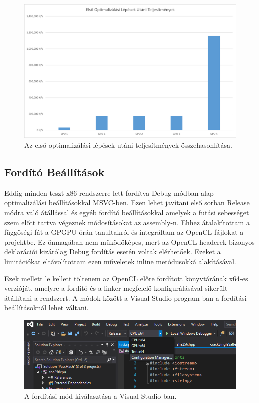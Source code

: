 \begin{figure}[H]
    \centering
    \includegraphics[width=\textwidth]{images/charts/performance-1-optimization.png}
    \caption{Az első optimalizálási lépések utáni teljesítmények összehasonlítása.}
\end{figure}





\subsection{Fordító Beállítások}

Eddig minden teszt x86 rendszerre lett fordítva Debug módban alap optimalizálási beállításokkal MSVC-ben. Ezen lehet javítani első sorban Release módra való átállással és egyéb fordító beállításokkal amelyek a futási sebességet szem előtt tartva végeznek módosításokat az assembly-n. Ehhez átalakítottam a függőségi fát a GPGPU órán tanultakról és integráltam az OpenCL fájlokat a projektbe. Ez önmagában nem működőképes, mert az OpenCL headerek bizonyos deklarációi kizárólag Debug fordítás esetén voltak elérhetőek. Ezeket a limitációkat eltávolítottam ezen műveletek inline metódusokká alakításával.

Ezek mellett le kellett töltenem az OpenCL előre fordított könyvtárának x64-es verzióját, amelyre a fordító és a linker megfelelő konfigurálásával sikerült átállítani a rendszert. A módok között a Visual Studio program-ban a fordítási beállításoknál lehet váltani.

\begin{figure}[H]
    \centering
    \includegraphics[width=\textwidth]{images/illustrations/visualstudio-compile-modes.png}
    \caption{A fordítási mód kiválasztása a Visual Studio-ban.}
\end{figure}

